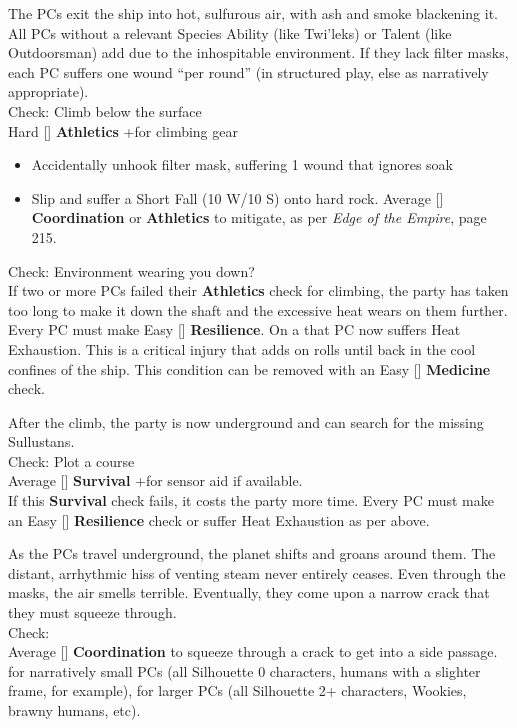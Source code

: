 \documentclass{book}
\newcommand{\df}{\difficulty}
\begin{document}
\begin{multicols*}{2}
The PCs exit the ship into hot, sulfurous air, with ash and smoke blackening it. All PCs without a relevant Species Ability (like Twi'leks) or Talent (like Outdoorsman) add \setback due to the inhospitable environment.  If they lack filter masks, each PC suffers one wound ``per round'' (in structured play, else as narratively appropriate).\\
Check: Climb below the surface\\
Hard [\df\df\df] \textbf{Athletics} +\boost for climbing gear
\begin{itemize}
  \item \threat\threat Accidentally unhook filter mask, suffering 1 wound that ignores soak
  \item \despair Slip and suffer a Short Fall (10 W/10 S) onto hard rock.  Average [\df\df] \textbf{Coordination} or \textbf{Athletics} to mitigate, as per \emph{Edge of the Empire}, page 215.
\end{itemize}
Check: Environment wearing you down?\\
If two or more PCs failed their \textbf{Athletics} check for climbing, the party has taken too long to make it down the shaft and the excessive heat wears on them further. Every PC must make Easy [\df] \textbf{Resilience}. On a \failure that PC now suffers Heat Exhaustion.  This is a critical injury that adds \setback on rolls until back in the cool confines of the ship. This condition can be removed with an Easy [\df] \textbf{Medicine} check.

After the climb, the party is now underground and can search for the missing Sullustans.\\
Check: Plot a course\\
Average [\df\df] \textbf{Survival} +\boost for sensor aid if available.\\
If this \textbf{Survival} check fails, it costs the party more time. Every PC must make an Easy [\df] \textbf{Resilience} check or suffer Heat Exhaustion as per above.

As the PCs travel underground, the planet shifts and groans around them. The distant, arrhythmic hiss of venting steam never entirely ceases. Even through the masks, the air smells terrible. Eventually, they come upon a narrow crack that they must squeeze through.\\
Check:\\
Average [\df\df] \textbf{Coordination} to squeeze through a crack to get into a side passage. \boost for narratively small PCs (all Silhouette 0 characters, humans with a slighter frame, for example), \setback for larger PCs (all Silhouette 2+ characters, Wookies, brawny humans, etc).


\end{multicols*}
\end{document}
